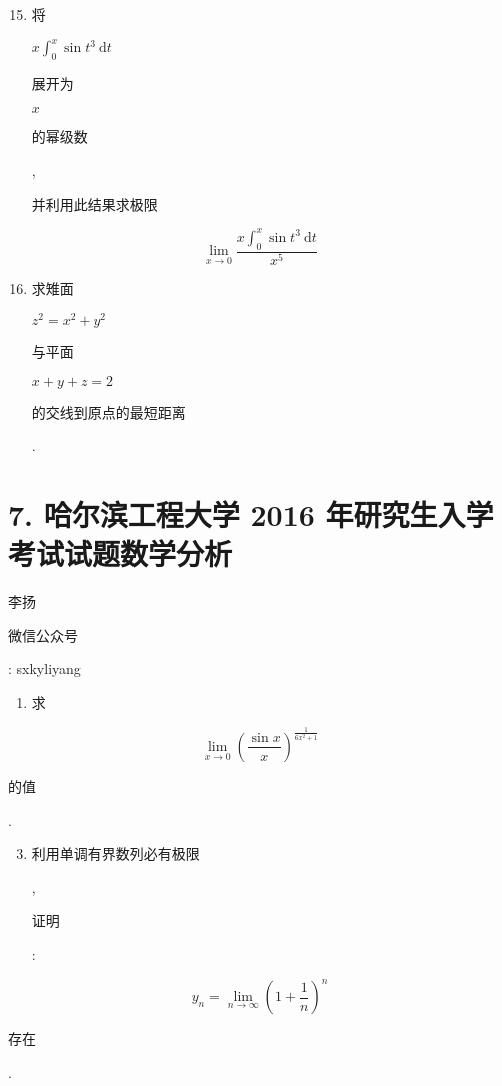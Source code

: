 \documentclass[10pt]{article}
\begin{document}
\begin{enumerate}
  \setcounter{enumi}{14}
  \item \begin{CJK}{UTF8}{mj}将\end{CJK} $x \int_{0}^{x} \sin t^{3} \mathrm{~d} t$ \begin{CJK}{UTF8}{mj}展开为\end{CJK} $x$ \begin{CJK}{UTF8}{mj}的幂级数\end{CJK}, \begin{CJK}{UTF8}{mj}并利用此结果求极限\end{CJK}
\end{enumerate}
$$
\lim _{x \rightarrow 0} \frac{x \int_{0}^{x} \sin t^{3} \mathrm{~d} t}{x^{5}}
$$

\begin{enumerate}
  \setcounter{enumi}{15}
  \item \begin{CJK}{UTF8}{mj}求雉面\end{CJK} $z^{2}=x^{2}+y^{2}$ \begin{CJK}{UTF8}{mj}与平面\end{CJK} $x+y+z=2$ \begin{CJK}{UTF8}{mj}的交线到原点的最短距离\end{CJK}.
\end{enumerate}
\section{7. 哈尔滨工程大学 2016 年研究生入学考试试题数学分析}
\begin{CJK}{UTF8}{mj}李扬\end{CJK}

\begin{CJK}{UTF8}{mj}微信公众号\end{CJK}: sxkyliyang

\begin{enumerate}
  \item \begin{CJK}{UTF8}{mj}求\end{CJK}
\end{enumerate}
$$
\lim _{x \rightarrow 0}\left(\frac{\sin x}{x}\right)^{\frac{1}{6 x^{2}+1}}
$$
\begin{CJK}{UTF8}{mj}的值\end{CJK}.

\begin{enumerate}
  \setcounter{enumi}{2}
  \item \begin{CJK}{UTF8}{mj}利用单调有界数列必有极限\end{CJK}, \begin{CJK}{UTF8}{mj}证明\end{CJK}:
\end{enumerate}
$$
y_{n}=\lim _{n \rightarrow \infty}\left(1+\frac{1}{n}\right)^{n}
$$
\begin{CJK}{UTF8}{mj}存在\end{CJK}.
\end{document}
